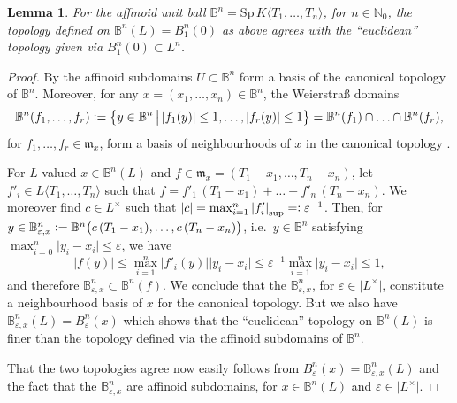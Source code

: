 \documentclass[a4paper, reqno, 10pt]{amsart}
\newtheorem{lemma}[theorem]{Lemma}
\theoremstyle{definition}
\numberwithin{equation}{section}
\newcommand{\abs}[1]{{\lvert{#1}\rvert}}
\newcommand{\defeq}{\vcentcolon=}
\newcommand{\eqdef}{=\vcentcolon}
\newcommand{\Sp}{{\mathrm{Sp}}}
\newcommand{\unts}{^{\times}}
\newcommand{\BB}{{\mathbb {B}}}
\newcommand{\BN}{{\mathbb {N}}}
\newcommand{\Fm}{{\mathfrak {m}}}
\begin{document}
\begin{lemma}\label{Lemma 1 - Comparision of canonical topology of rigid unit ball}
	For the affinoid unit ball $\BB^n = \Sp \, K \langle T_1,\ldots,T_n \rangle$, for $n\in \BN_0$, the topology defined on $\BB^n(L) = B_1^{n}(0)$ as above agrees with the ``euclidean'' topology given via $B_1^{n}(0) \subset L^n$.
\end{lemma}
\begin{proof}
	By \cite[7.2.5 Cor.\ 4]{BoschGuentzerRemmert84NonArchAna} the affinoid subdomains $U\subset \BB^n$ form a basis of the canonical topology of $\BB^n$.
	Moreover, for any $x=(x_1,\ldots,x_n)\in \BB^n$, the Weierstra{\ss} domains
	\begin{equation*} 
		\BB^n (f_1,\ldots,f_r) \defeq \big\{ y \in \BB^n \,\big\vert\, \abs{f_1(y)} \leq 1, \ldots, \abs{f_r(y)}\leq 1 \big\} = \BB^n(f_1)\cap\ldots\cap\BB^n(f_r) ,
	\end{equation*}
	for $f_1,\ldots,f_r \in \Fm_x$, form a basis of neighbourhoods of $x$ in the canonical topology \cite[7.2.1, Prop.\ 3 (ii)]{BoschGuentzerRemmert84NonArchAna}.
	
	
	For $L$-valued $x \in \BB^n(L)$ and $f\in \Fm_x = (T_1 - x_1,\ldots,T_n - x_n)$, let $f'_i \in L\langle T_1,\ldots,T_n \rangle$ such that $f= f'_1 \, (T_1-x_1) +\ldots + f'_n \, (T_n-x_n)$.
	We moreover find $c\in L\unts$ such that $\abs{c}=\max_{i=1}^n \abs{f'_i}_\mathrm{sup}\eqdef \varepsilon^{-1}$. 
	Then, for $y \in \BB^n_{{\varepsilon},x} \defeq \BB^n\big(c\,(T_1-x_1),\ldots,c\,(T_n-x_n) \big)$, i.e.\ $y\in \BB^n$ satisfying $\max_{i=0}^n \abs{y_i - x_i} \leq {\varepsilon}$, we have
	\begin{equation*}
		\abs{f(y)}\leq \max_{i=1}^n \abs{f'_i(y)}\abs{y_i - x_i} \leq \varepsilon^{-1} \max_{i=1}^n \abs{y_i - x_i} \leq 1 ,
	\end{equation*}
	and therefore $\BB^n_{{\varepsilon},x} \subset \BB^n (f)$.
	We conclude that the $\BB^n_{{\varepsilon},x}$, for $\varepsilon \in \abs{L\unts}$, constitute a neighbourhood basis of $x$ for the canonical topology.
	But we also have $\BB^n_{{\varepsilon},x}(L) = B^{n}_{\varepsilon}(x)$ which shows that the ``euclidean'' topology on $\BB^n(L)$ is finer than the topology defined via the affinoid subdomains of $\BB^n$.
	
	
	That the two topologies agree now easily follows from $B^{n}_\varepsilon (x) = \BB^n_{\varepsilon,x} (L)$ and the fact that the $\BB^n_{\varepsilon,x}$ are affinoid subdomains, for $x\in \BB^n(L)$ and $\varepsilon \in \abs{L\unts}$.
\end{proof}
\end{document}
